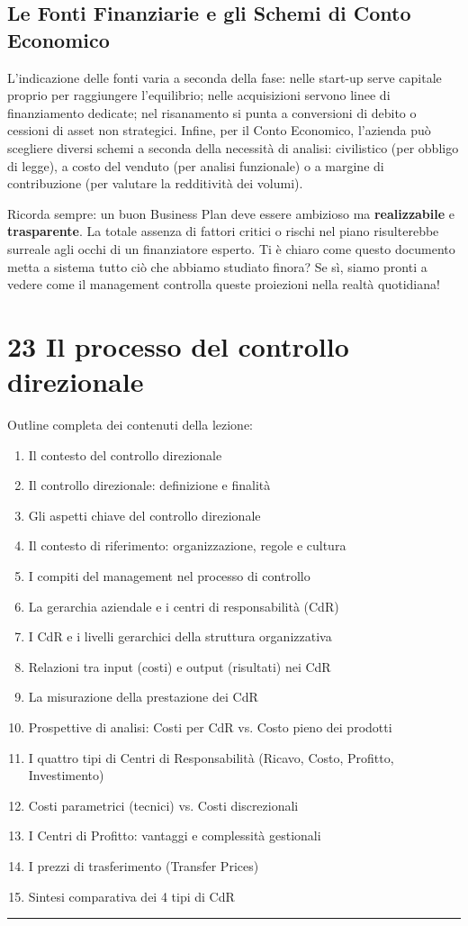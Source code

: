 \documentclass[a4paper,10pt]{article}
\begin{document}
\subsection*{Le Fonti Finanziarie e gli Schemi di Conto Economico}

L'indicazione delle fonti varia a seconda della fase: nelle start-up serve capitale proprio per raggiungere l'equilibrio; nelle acquisizioni servono linee di finanziamento dedicate; nel risanamento si punta a conversioni di debito o cessioni di asset non strategici.
Infine, per il Conto Economico, l'azienda può scegliere diversi schemi a seconda della necessità di analisi: civilistico (per obbligo di legge), a costo del venduto (per analisi funzionale) o a margine di contribuzione (per valutare la redditività dei volumi).

Ricorda sempre: un buon Business Plan deve essere ambizioso ma \textbf{realizzabile} e \textbf{trasparente}. La totale assenza di fattori critici o rischi nel piano risulterebbe surreale agli occhi di un finanziatore esperto. Ti è chiaro come questo documento metta a sistema tutto ciò che abbiamo studiato finora? Se sì, siamo pronti a vedere come il management controlla queste proiezioni nella realtà quotidiana!

\section*{23 Il processo del controllo direzionale}

Outline completa dei contenuti della lezione:
{\small
\begin{enumerate}
\item Il contesto del controllo direzionale
\item Il controllo direzionale: definizione e finalità
\item Gli aspetti chiave del controllo direzionale
\item Il contesto di riferimento: organizzazione, regole e cultura
\item I compiti del management nel processo di controllo
\item La gerarchia aziendale e i centri di responsabilità (CdR)
\item I CdR e i livelli gerarchici della struttura organizzativa
\item Relazioni tra input (costi) e output (risultati) nei CdR
\item La misurazione della prestazione dei CdR
\item Prospettive di analisi: Costi per CdR vs. Costo pieno dei prodotti
\item I quattro tipi di Centri di Responsabilità (Ricavo, Costo, Profitto, Investimento)
\item Costi parametrici (tecnici) vs. Costi discrezionali
\item I Centri di Profitto: vantaggi e complessità gestionali
\item I prezzi di trasferimento (Transfer Prices)
\item Sintesi comparativa dei 4 tipi di CdR
\end{enumerate}
}
\hrule
\vspace{0.5cm}
\end{document}

